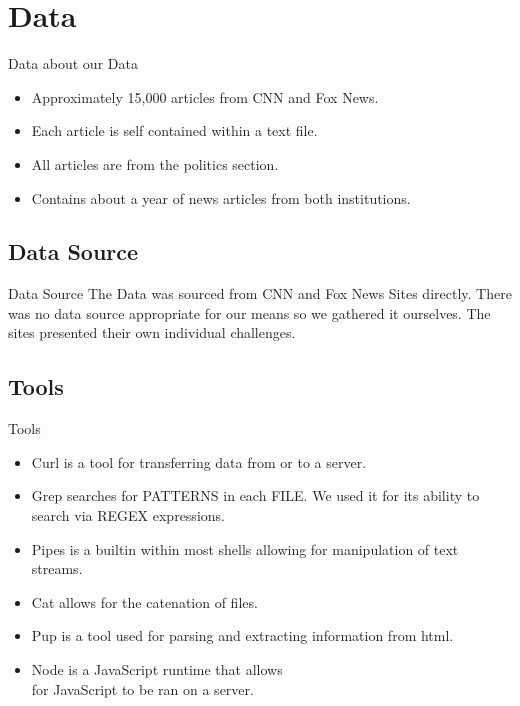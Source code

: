 \documentclass{beamer}
\begin{document}
\section{Data}
\begin{frame}{Data about our Data}
	\begin{itemize}
		\item<1-> Approximately 15,000 articles from CNN and Fox News. \pause
		\item<2-> Each article is self contained within a text file. \pause
		\item<3-> All articles are from the politics section. \pause
		\item<4-> Contains about a year of news articles from both institutions.
	\end{itemize}


\end{frame}
\subsection{Data Source}
\begin{frame}{Data Source}
	The Data was sourced from CNN and Fox News Sites directly.
	There was no data source appropriate for our means so we gathered it ourselves.
	The sites presented their own individual challenges.
\end{frame}
\subsection{Tools}
\begin{frame}{Tools}
	\begin{itemize}
		\item<1->Curl is a tool for transferring data from or to a server.
		\item<2->Grep searches  for  PATTERNS  in  each  FILE. We used it for its ability to search via REGEX expressions.
		\item<3->Pipes is a builtin within most shells allowing for manipulation of text streams.
		\item<4->Cat allows for the catenation of files.
		\item<5->Pup is a tool used for parsing and extracting information from html.
		\item<6->Node is a JavaScript runtime that allows \\for JavaScript to be ran on a server.
	\end{itemize}
\end{frame}
\end{document}
